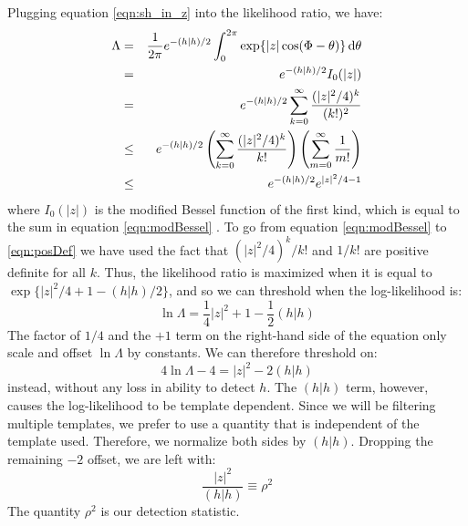 Plugging equation \ref{eqn:sh_in_z} into the likelihood ratio, we have:
\begin{eqnarray}
\Lambda & = & \frac{1}{2\pi} e^{-(h|h)/2} \int_0^{2\pi} \exp\{ |z|\cos(\Phi - \theta) \} \d \theta \nonumber \\
 & = & e^{-(h|h)/2} I_0(|z|) \nonumber \\
\label{eqn:modBessel}
 & = & e^{-(h|h)/2} \sum_{k=0}^{\infty} \frac{(|z|^{2}/4)^{k}}{(k!)^2} \\
 \label{eqn:posDef}
 & \leq & e^{-(h|h)/2} \left( \sum_{k=0}^{\infty} \frac{ (|z|^{2}/4)^k }{k!} \right) \left(\sum_{m=0}^{\infty} \frac{1}{m!}\right) \\
 & \leq & e^{-(h|h)/2} e^{|z|^{2}/4 - 1}
\end{eqnarray}
where $I_0(|z|)$ is the modified Bessel function of the first kind, which is equal to the sum in equation \ref{eqn:modBessel} \cite{ref:Wolfram}. To go from equation \ref{eqn:modBessel} to \ref{eqn:posDef} we have used the fact that $(|z|^{2}/4)^{k}/k!$ and $1/k!$ are positive definite for all $k$. Thus, the likelihood ratio is maximized when it is equal to $\exp\{ |z|^2/4 + 1 - (h|h)/2 \}$, and so we can threshold when the log-likelihood is:
\begin{equation}
\ln \Lambda = \frac{1}{4}|z|^2 + 1 - \frac{1}{2}(h|h)
\end{equation}
The factor of $1/4$ and the $+1$ term on the right-hand side of the equation only scale and offset $\ln\Lambda$ by constants. We can therefore threshold on:
\begin{equation}
4 \ln \Lambda - 4 = |z|^2 - 2(h|h)
\end{equation}
instead, without any loss in ability to detect $h$. The $(h|h)$ term, however, causes the log-likelihood to be template dependent. Since we will be filtering multiple templates, we prefer to use a quantity that is independent of the template used. Therefore, we normalize both sides by $(h|h)$. Dropping the remaining $-2$ offset, we are left with:
\begin{equation}
\frac{|z|^2}{(h|h)} \equiv \rho^{2}
\end{equation}
The quantity $\rho^2$ is our detection statistic.

